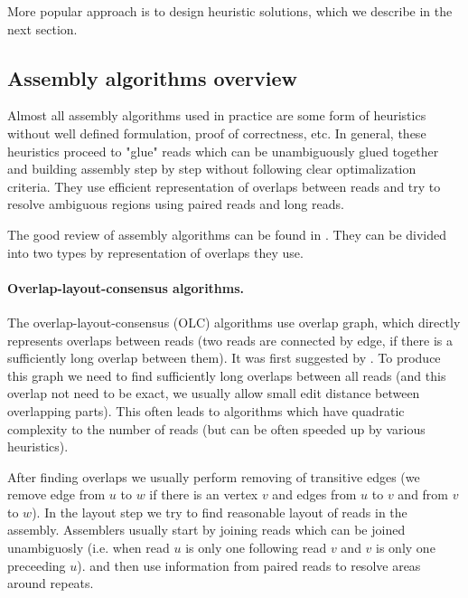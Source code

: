 More popular approach is to design heuristic solutions, which we describe in the next
section.

\subsection{Assembly algorithms overview}

Almost all assembly algorithms used in practice are some form of heuristics
without well defined formulation, proof of correctness, etc.
In general, these heuristics proceed to "glue" reads which can be
unambiguously glued together and building assembly step by step
without following clear optimalization criteria.
They use efficient representation of overlaps between reads and try to resolve
ambiguous regions using paired reads and long reads.

The good review of assembly algorithms can be found in \citet{miller2010assembly}.
They can be divided into two types by representation of overlaps they use.

\paragraph{Overlap-layout-consensus algorithms.}
The overlap-layout-consensus (OLC) algorithms use overlap graph, which directly represents
overlaps between reads (two reads are connected by edge, if there is a sufficiently long overlap between them). It was first suggested by \citet{myers1995toward}.
To produce this graph we need to find sufficiently long
overlaps between all reads (and this overlap not need to be exact, we usually allow small edit distance between overlapping parts). This often leads to algorithms which have quadratic
complexity to the number of reads (but can be often speeded up by various heuristics).

After finding overlaps we usually perform removing of transitive edges (we remove edge
from $u$ to $w$ if there is an vertex $v$ and edges from $u$ to $v$ and from $v$ to $w$).
In the layout step we try to find reasonable layout of reads in the assembly.
Assemblers usually start by joining reads which can be joined unambiguosly (i.e.
when read $u$ is only one following read $v$ and $v$ is only one preceeding $u$).
and then use information from paired reads to resolve areas around repeats.

